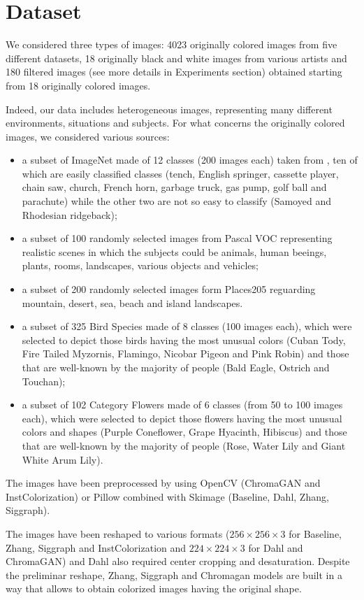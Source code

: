 \section{Dataset}
We considered three types of images: 4023 originally colored images from five different datasets, 18 originally black and white images from various artists and 180 filtered images (see more details in Experiments section) obtained starting from 18 originally colored images.

Indeed, our data includes heterogeneous images, representing many different environments, situations and subjects.
For what concerns the originally colored images, we considered various sources:
\begin{itemize}
	\item a subset of ImageNet made of 12 classes (200 images each) taken from \cite{imagenette}, ten of which are easily classified classes (tench, English springer, cassette player, chain saw, church, French horn, garbage truck, gas pump, golf ball and parachute) while the other two are not so easy to classify (Samoyed and Rhodesian ridgeback);
	\item a subset of 100 randomly selected images from Pascal VOC \cite{pascal} representing realistic scenes in which the subjects could be animals, human beeings, plants, rooms, landscapes, various objects and vehicles;
	\item a subset of 200 randomly selected images form Places205 \cite{place} reguarding mountain, desert, sea, beach and island landscapes.
	\item a subset of 325 Bird Species \cite{bird} made of 8 classes (100 images each), which were selected to depict those birds having the most unusual colors (Cuban Tody, Fire Tailed Myzornis, Flamingo, Nicobar Pigeon and Pink Robin) and those that are well-known by the majority of people (Bald Eagle, Ostrich and Touchan);
	\item a subset of 102 Category Flowers \cite{flower} made of 6 classes (from 50 to 100 images each), which were selected to depict those flowers having the most unusual colors and shapes (Purple Coneflower, Grape Hyacinth, Hibiscus) and those that are well-known by the majority of people (Rose, Water Lily and Giant White Arum Lily).
\end{itemize}

The images have been preprocessed by using OpenCV (ChromaGAN and InstColorization) or Pillow combined with Skimage
(Baseline, Dahl, Zhang, Siggraph).

The images have been reshaped to various formats ($256\times256\times3$ for Baseline, Zhang, Siggraph and InstColorization
and $224\times224\times3$ for Dahl and ChromaGAN) and Dahl also required center cropping and desaturation. Despite the
preliminar reshape, Zhang, Siggraph and Chromagan models are built in a way that allows to obtain colorized images
having the original shape.

